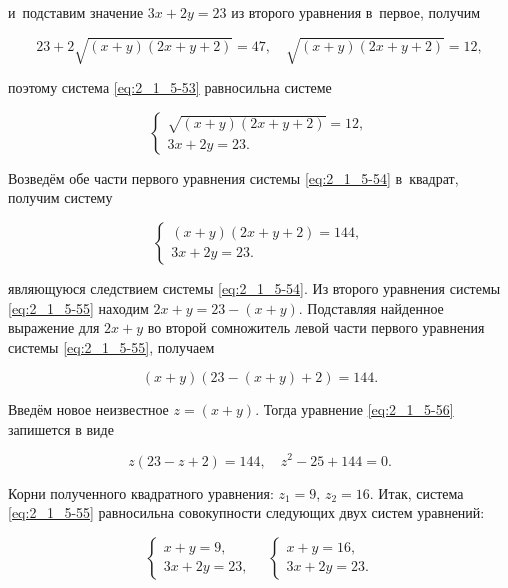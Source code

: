\noindent
и~подставим значение $3x + 2y = 23$ из второго уравнения в~первое, получим

\begin{equation*}
23 + 2\sqrt{(x + y)(2x + y + 2)} = 47, \quad \sqrt{(x + y)(2x + y +2)} = 12,
\end{equation*}

\noindent
поэтому система \eqref{eq:2_1_5-53} равносильна системе

\begin{equation}\label{eq:2_1_5-54}
\begin{cases}
\sqrt{(x + y)(2x + y + 2)} = 12, \\
3x + 2y = 23.
\end{cases}
\end{equation}

Возведём обе части первого уравнения системы \eqref{eq:2_1_5-54} в~квадрат,
получим систему

\begin{equation}\label{eq:2_1_5-55}
\begin{cases}
(x + y)(2x + y + 2) = 144, \\
3x + 2y = 23.
\end{cases}
\end{equation}

\noindent
являющуюся следствием системы \eqref{eq:2_1_5-54}.
Из второго уравнения системы \eqref{eq:2_1_5-55} находим $2x + y = 23 - (x + y)$.
Подставляя найденное выражение для $2x + y$ во второй сомножитель левой части
первого уравнения системы \eqref{eq:2_1_5-55}, получаем

\begin{equation}\label{eq:2_1_5-56}
(x + y)(23 - (x + y) + 2) = 144.
\end{equation}

Введём новое неизвестное $z = (x + y)$. Тогда уравнение \eqref{eq:2_1_5-56}
запишется в виде

\begin{equation*}
z(23 - z + 2) = 144, \quad z^{2} - 25 + 144 = 0.
\end{equation*}

Корни полученного квадратного уравнения: $z_{1} = 9$, $z_{2} = 16$.
Итак, система \eqref{eq:2_1_5-55} равносильна совокупности следующих
двух систем уравнений:

\begin{equation*}
\begin{cases}
x + y = 9, \\
3x + 2y = 23,
\end{cases}
\quad
\begin{cases}
x + y = 16, \\
3x + 2y = 23.
\end{cases}
\end{equation*}

